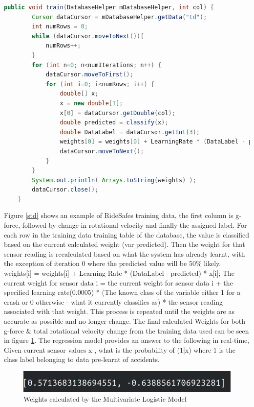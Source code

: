 \begin{lstlisting}[language=Java,basicstyle=\small, breaklines=true, label={lst:train},caption={Training/updating the Model}]
  public void train(DatabaseHelper mDatabaseHelper, int col) {
        Cursor dataCursor = mDatabaseHelper.getData("td");
        int numRows = 0;
        while (dataCursor.moveToNext()){
            numRows++;
        }
        for (int n=0; n<numIterations; n++) {
            dataCursor.moveToFirst();
            for (int i=0; i<numRows; i++) {
                double[] x;
                x = new double[1];
                x[0] = dataCursor.getDouble(col);
                double predicted = classify(x);
                double DataLabel = dataCursor.getInt(3);
                weights[0] = weights[0] + LearningRate * (DataLabel - predicted) * x[0];
                dataCursor.moveToNext();
            }
        }
        System.out.println( Arrays.toString(weights) );
        dataCursor.close();
    }
\end{lstlisting}




Figure \ref{std} shows an example of RideSafes training data, the first column is g-force, followed by change in rotational velocity and finally the assigned label.
For each row in the training data training table of the database,  the value is classified based on the current calculated weight (var predicted). Then the weight for that sensor reading is recalculated based on what the system has already learnt, with the exception of iteration 0 where the predicted value will be 50\% likely. 
  weights[i] = weights[i] + Learning Rate * (DataLabel - predicted) * x[i];
The current weight for sensor data i = the current weight for sensor data i + the specified learning rate(0.0005) * (The known class of the variable either 1 for a crash or 0 otherwise - what it currently classifies as) * the sensor reading associated with that weight. This process is repeated until the weights are as accurate as possible and no longer change. The final calculated Weights for both g-force \& total rotational velocity change from the training data used can be seen in figure \ref{weights}. The regression model provides an answer to the following in real-time, Given current sensor values x , what is the probability of (1|x) where 1 is the class label belonging to data pre-learnt of accidents.




\begin{figure}[h]
      \centering
      \includegraphics[scale = .5]{implementation/weights.png}
      \caption{Weights calculated by the Multivariate Logistic Model}
      \label{weights}
\end{figure}

